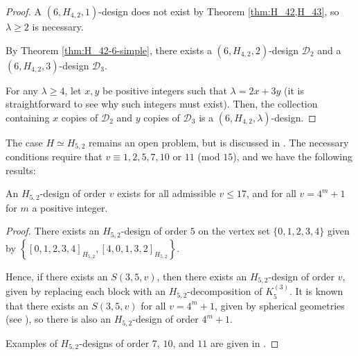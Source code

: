 \begin{proof}
A $(6, H_{4,2}, 1)$-design does not exist by Theorem \ref{thm:H_42,H_43}, so $\lambda \geq 2$ is necessary.

By Theorem \ref{thm:H_42-6-simple}, there exists a $(6, H_{4,2}, 2)$-design $\mathcal{D}_2$ and a $(6, H_{4,2}, 3)$-design $\mathcal{D}_3$.

For any $\lambda \geq 4$, let $x, y$ be positive integers such that $\lambda = 2x + 3y$
  (it is straightforward to see why such integers must exist).
Then, the collection containing $x$ copies of $\mathcal{D}_2$ and $y$ copies of $\mathcal{D}_3$ is a $(6, H_{4,2}, \lambda)$-design.
\end{proof}




The case $H \simeq H_{5,2}$ remains an open problem, but is discussed in \cite{mesz-rosa}.
The necessary conditions require that $v \equiv 1, 2, 5, 7, 10$ or $11$ (mod $15$), and we have the following results:

\begin{theorem} \label{thm:H_52}
An $H_{5,2}$-design of order $v$ exists for all admissible $v \leq 17$, and for
all $v = 4^m + 1$ for $m$ a positive integer.
\end{theorem}

\begin{proof}
There exists an $H_{5,2}$-design of order $5$ on the vertex set $\{0,1,2,3,4\}$
  given by $\left\{[0,1,2,3,4]_{H_{5,2}}, [4, 0, 1, 3, 2]_{H_{5,2}} \right\}$.

Hence, if there exists an $S(3, 5, v)$, then there exists an $H_{5,2}$-design of order $v$, given by replacing each block with an $H_{5,2}$-decomposition of $K_5^{(3)}$.
It is known that there exists an $S(3, 5, v)$ for all $v = 4^m+1$, given by spherical geometries (see \cite{khos-laue}), so there is also an $H_{5,2}$-design of order $4^m+1$.

Examples of $H_{5,2}$-designs of order $7$, $10$, and $11$ are given in \cite{mesz-rosa}.
\end{proof}
